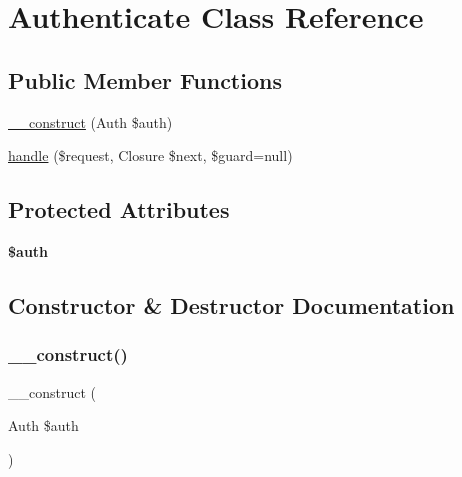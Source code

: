 \hypertarget{class_app_1_1_http_1_1_middleware_1_1_authenticate}{}\section{Authenticate Class Reference}
\label{class_app_1_1_http_1_1_middleware_1_1_authenticate}
\subsection*{Public Member Functions}
\begin{DoxyCompactItemize}
\item 
\mbox{\hyperlink{class_app_1_1_http_1_1_middleware_1_1_authenticate_a4fc8a33bcaac7c3af3e9969dda3711ce}{\+\_\+\+\_\+construct}} (Auth \$auth)
\item 
\mbox{\hyperlink{class_app_1_1_http_1_1_middleware_1_1_authenticate_a9a62f11233fd9dce6393364e01b04001}{handle}} (\$request, Closure \$next, \$guard=null)
\end{DoxyCompactItemize}
\subsection*{Protected Attributes}
\begin{DoxyCompactItemize}
\item 
\mbox{\label{class_app_1_1_http_1_1_middleware_1_1_authenticate_a20d7415a9c3391b32d7fe2136fce6e2c}} 
{\bfseries \$auth}
\end{DoxyCompactItemize}


\subsection{Constructor \& Destructor Documentation}
\mbox{\label{class_app_1_1_http_1_1_middleware_1_1_authenticate_a4fc8a33bcaac7c3af3e9969dda3711ce}} 
\subsubsection{\texorpdfstring{\+\_\+\+\_\+construct()}{\_\_construct()}}
{\footnotesize\ttfamily \+\_\+\+\_\+construct (\begin{DoxyParamCaption}\item[{Auth}]{\$auth }\end{DoxyParamCaption})}

